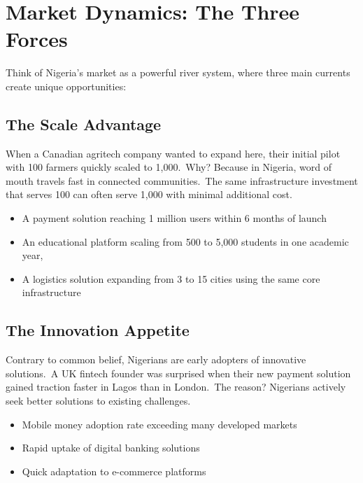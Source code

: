 \section{Market Dynamics: The Three Forces}\label{sec:market-dynamics:-the-three-forces}

Think of Nigeria's market as a powerful river system, where three main currents create unique opportunities:

\subsection{The Scale Advantage}\label{subsec:the-scale-advantage}
When a Canadian agritech company wanted to expand here, their initial pilot with 100 farmers quickly scaled to 1,000.\ Why?
Because in Nigeria, word of mouth travels fast in connected communities.\ The same infrastructure investment that serves 100 can often serve 1,000 with minimal additional cost.

\begin{tcolorbox}[colback=white,colframe=primarydark,title=\textbf{Scale Impact Examples}]
\begin{itemize}
    \item A payment solution reaching 1 million users within 6 months of launch
    \item An educational platform scaling from 500 to 5,000 students in one academic year,
    \item A logistics solution expanding from 3 to 15 cities using the same core infrastructure
\end{itemize}
\end{tcolorbox}

\subsection{The Innovation Appetite}\label{subsec:the-innovation-appetite}
Contrary to common belief, Nigerians are early adopters of innovative solutions.\ A UK fintech founder was surprised when their new payment solution gained traction faster in Lagos than in London.\ The reason?
Nigerians actively seek better solutions to existing challenges.

\begin{tcolorbox}[colback=white,colframe=primary,title=\textbf{Innovation Adoption Examples}]
\begin{itemize}
    \item Mobile money adoption rate exceeding many developed markets
    \item Rapid uptake of digital banking solutions
    \item Quick adaptation to e-commerce platforms
\end{itemize}
\end{tcolorbox}

